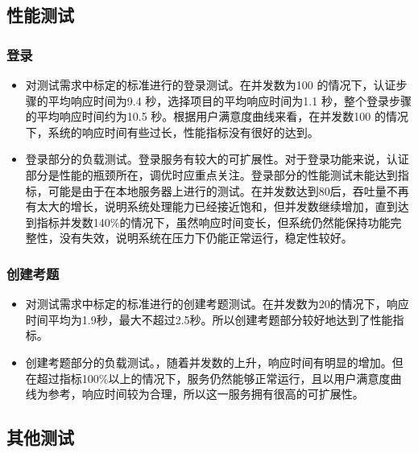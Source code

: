 \documentclass[hyperref, a4paper]{ctexart}
\providecommand{\tightlist}{%
  \setlength{\itemsep}{0pt}\setlength{\parskip}{0pt}}
\begin{document}
\hypertarget{ux6027ux80fdux6d4bux8bd5-1}{%
\subsection{性能测试}\label{ux6027ux80fdux6d4bux8bd5-1}}

\hypertarget{ux767bux5f55}{%
\subsubsection{登录}\label{ux767bux5f55}}

\begin{itemize}
\tightlist
\item
  对测试需求中标定的标准进行的登录测试。在并发数为100
  的情况下，认证步骤的平均响应时间为9.4 秒，选择项目的平均响应时间为1.1
  秒，整个登录步骤的平均响应时间约为10.5
  秒。根据用户满意度曲线来看，在并发数100
  的情况下，系统的响应时间有些过长，性能指标没有很好的达到。
\item
  登录部分的负载测试。登录服务有较大的可扩展性。对于登录功能来说，认证部分是性能的瓶颈所在，调优时应重点关注。登录部分的性能测试未能达到指标，可能是由于在本地服务器上进行的测试。在并发数达到80后，吞吐量不再有太大的增长，说明系统处理能力已经接近饱和，但并发数继续增加，直到达到指标并发数140\%的情况下，虽然响应时间变长，但系统仍然能保持功能完整性，没有失效，说明系统在压力下仍能正常运行，稳定性较好。
\end{itemize}

\hypertarget{ux521bux5efaux8003ux9898}{%
\subsubsection{创建考题}\label{ux521bux5efaux8003ux9898}}

\begin{itemize}
\tightlist
\item
  对测试需求中标定的标准进行的创建考题测试。在并发数为20的情况下，响应时间平均为1.9秒，最大不超过2.5秒。所以创建考题部分较好地达到了性能指标。
\item
  创建考题部分的负载测试。，随着并发数的上升，响应时间有明显的增加。但在超过指标100\%以上的情况下，服务仍然能够正常运行，且以用户满意度曲线为参考，响应时间较为合理，所以这一服务拥有很高的可扩展性。
\end{itemize}

\hypertarget{ux5176ux4ed6ux6d4bux8bd5}{%
\subsection{其他测试}\label{ux5176ux4ed6ux6d4bux8bd5}}
\end{document}
